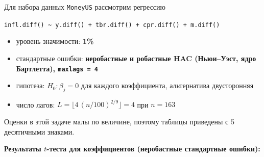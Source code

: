 \documentclass[
  russian,
]{article}
\providecommand{\tightlist}{%
  \setlength{\itemsep}{0pt}\setlength{\parskip}{0pt}}
\begin{document}
Для набора данных \texttt{MoneyUS} рассмотрим регрессию

\texttt{infl.diff()\ \textasciitilde{}\ y.diff()\ +\ tbr.diff()\ +\ cpr.diff()\ +\ m.diff()}

\begin{tcolorbox}[enhanced jigsaw, arc=.35mm, bottomrule=.15mm, bottomtitle=1mm, breakable, colback=white, colbacktitle=quarto-callout-important-color!10!white, colframe=quarto-callout-important-color-frame, coltitle=black, left=2mm, leftrule=.75mm, opacityback=0, opacitybacktitle=0.6, rightrule=.15mm, title=\textcolor{quarto-callout-important-color}{\faExclamation}\hspace{0.5em}{Условия теста}, titlerule=0mm, toprule=.15mm, toptitle=1mm]

\begin{itemize}
\tightlist
\item
  уровень значимости: \textbf{1\%}
\item
  стандартные ошибки: \textbf{неробастные и робастные HAC (Ньюи--Уэст,
  ядро Бартлетта), \texttt{maxlags\ =\ 4}}
\item
  гипотеза: \(H_0:\beta_j=0\) для каждого коэффициента, альтернатива
  двусторонняя
\item
  число лагов: \(L=\lfloor 4\,(n/100)^{2/9}\rfloor = 4\) при \(n=163\)
\end{itemize}

\end{tcolorbox}

Оценки в этой задаче малы по величине, поэтому таблицы приведены с 5
десятичными знаками.

\textbf{Результаты \(t\)-теста для коэффициентов (неробастные
стандартные ошибки):}
\end{document}
